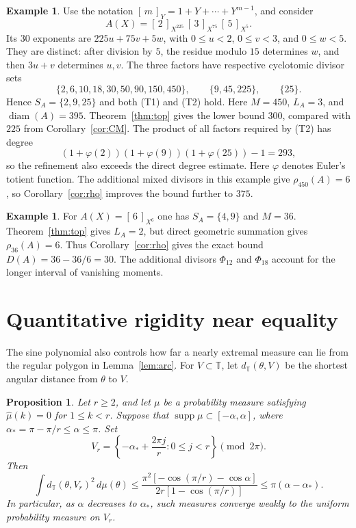 \documentclass[11pt]{article}
\newtheorem{proposition}[theorem]{Proposition}
\theoremstyle{definition}
\newtheorem{example}[theorem]{Example}
\theoremstyle{remark}
\numberwithin{equation}{section}
\DeclareMathOperator{\supp}{supp}
\DeclareMathOperator{\diam}{diam}
\newcommand{\T}{\mathbb T}
\newcommand{\br}[2]{[\,#1\,]_{#2}}
\begin{document}
\begin{example}\label{ex:450}
Use the notation $\br mY=1+Y+\cdots+Y^{m-1}$, and consider
\[
 A(X)=\br2{X^{225}}\,\br3{X^{75}}\,\br5{X^5}.
\]
Its $30$ exponents are $225u+75v+5w$, with $0\le u<2$, $0\le v<3$,
and $0\le w<5$. They are distinct: after division by $5$, the residue
modulo $15$ determines $w$, and then $3u+v$ determines $u,v$.
The three factors have respective cyclotomic divisor sets
\[
 \{2,6,10,18,30,50,90,150,450\},\qquad
 \{9,45,225\},\qquad \{25\}.
\]
Hence $S_A=\{2,9,25\}$ and both (T1) and (T2) hold.
Here $M=450$, $L_A=3$, and $\diam(A)=395$.
Theorem~\ref{thm:top} gives the lower bound $300$, compared with $225$
from Corollary~\ref{cor:CM}. The product of all factors required by
(T2) has degree
\[
 (1+\varphi(2))(1+\varphi(9))(1+\varphi(25))-1=293,
\]
so the refinement also exceeds the direct degree estimate.
Here $\varphi$ denotes Euler's totient function. The additional mixed
divisors in this example give $\rho_{450}(A)=6$, so
Corollary~\ref{cor:rho} improves the bound further to $375$.
\end{example}

\begin{example}\label{ex:36}
For $A(X)=\br6{X^6}$ one has $S_A=\{4,9\}$ and $M=36$.
Theorem~\ref{thm:top} gives $L_A=2$, but direct geometric summation gives
$\rho_{36}(A)=6$. Thus Corollary~\ref{cor:rho} gives the exact bound
$D(A)=36-36/6=30$. The additional divisors $\Phi_{12}$ and $\Phi_{18}$
account for the longer interval of vanishing moments.
\end{example}

\section{Quantitative rigidity near equality}\label{sec:stability}

The sine polynomial also controls how far a nearly extremal measure
can lie from the regular polygon in Lemma~\ref{lem:arc}.
For $V\subset\T$, let $d_{\T}(\theta,V)$ be the shortest angular
distance from $\theta$ to $V$.

\begin{proposition}\label{prop:stability}
Let $r\ge2$, and let $\mu$ be a probability measure satisfying
$\widehat\mu(k)=0$ for $1\le k<r$. Suppose that
$\supp\mu\subset[-\alpha,\alpha]$, where
$\alpha_*=\pi-\pi/r\le\alpha\le\pi$. Set
\[
 V_r=\left\{-\alpha_*+\frac{2\pi j}{r}:0\le j<r\right\}\pmod{2\pi}.
\]
Then
\begin{equation}\label{eq:stability}
 \int d_{\T}(\theta,V_r)^2\,d\mu(\theta)
 \le\frac{\pi^2[-\cos(\pi/r)-\cos\alpha]}
 {2r[1-\cos(\pi/r)]}
 \le\pi(\alpha-\alpha_*).
\end{equation}
In particular, as $\alpha$ decreases to $\alpha_*$, such measures
converge weakly to the uniform probability measure on $V_r$.
\end{proposition}
\end{document}
